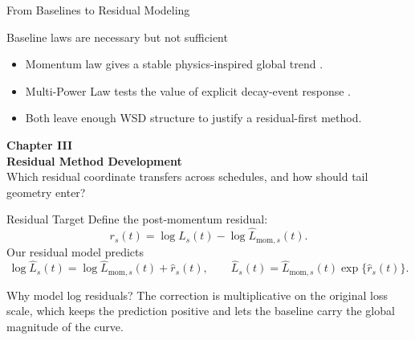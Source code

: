 \documentclass[fontset=fandol,aspectratio=169,10pt]{ctexbeamer}
\begin{document}
\begin{frame}{From Baselines to Residual Modeling}
  \begin{block}{Baseline laws are necessary but not sufficient}
    \begin{itemize}
      \item Momentum law gives a stable physics-inspired global trend
      \cite{tissue2026scaling}.
      \item Multi-Power Law tests the value of explicit decay-event response
      \cite{luo2025multi}.
      \item Both leave enough WSD structure to justify a residual-first method.
    \end{itemize}
  \end{block}
  \vspace{0.4em}
  \begin{center}
  \end{center}
\end{frame}

\begin{frame}[plain]
  \begin{center}
    \vspace{2.2em}
    {\Large\color{tdltBlue}\textbf{Chapter III}}\\[0.5em]
    {\huge\textbf{Residual Method Development}}\\[0.8em]
    \small Which residual coordinate transfers across schedules, and how should tail geometry enter?
  \end{center}
\end{frame}

\begin{frame}{Residual Target}
  Define the post-momentum residual:
  \[
    r_s(t)=\log L_s(t)-\log \widehat L_{\mathrm{mom},s}(t).
  \]
  Our residual model predicts
  \[
    \log \widehat L_s(t)=
    \log \widehat L_{\mathrm{mom},s}(t)+\widehat r_s(t),
    \qquad
    \widehat L_s(t)=\widehat L_{\mathrm{mom},s}(t)\exp\{\widehat r_s(t)\}.
  \]
  \begin{block}{Why model log residuals?}
    The correction is multiplicative on the original loss scale, which keeps the
    prediction positive and lets the baseline carry the global magnitude of the curve.
  \end{block}
\end{frame}
\end{document}
